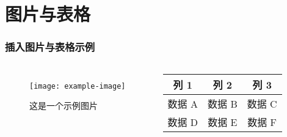 \documentclass[aspectratio=169]{beamer}
\begin{document}
\section{图片与表格}
\begin{frame}
    \frametitle{插入图片与表格示例}
    \begin{columns}[T] %
            \begin{figure}
                \centering
                \texttt{[image: example-image]} %
                \caption{这是一个示例图片}
            \end{figure}
            \begin{center}
            \begin{tabular}{|c|c|c|}
                \hline
                列 1 & 列 2 & 列 3 \\
                \hline
                数据 A & 数据 B & 数据 C \\
                \hline
                数据 D & 数据 E & 数据 F \\
                \hline
            \end{tabular}
            \end{center}
    \end{columns}
\end{frame}

\end{document}
